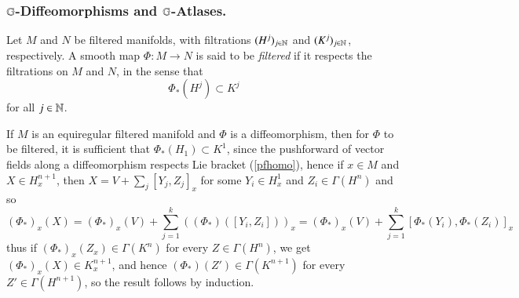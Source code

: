 \documentclass[leqno]{amsart}
\begin{document}
	
	\subsubsection{$\mathbb{G}$-Diffeomorphisms and $\mathbb{G}$-Atlases.}
	
	\begin{definition}
		Let $M$ and $N$ be filtered manifolds, with filtrations $(H^j)_{j\in\mathbb{N}}$ and $(K^j)_{j\in\mathbb{N}}$, respectively. A smooth map $\Phi:M\to N$ is said to be \textit{filtered} if it respects the filtrations on $M$ and $N$, in the sense that
		$$\Phi_*(H^j)\subset K^j$$
		for all $j\in\mathbb{N}$.
	\end{definition}
	
	\begin{remark}\label{firstlayer}
		If $M$ is an equiregular filtered manifold and $\Phi$ is a diffeomorphism, then for $\Phi$ to be filtered, it is sufficient that $\Phi_*(H_1)\subset K^1$, since the pushforward of vector fields along a diffeomorphism respects Lie bracket (\ref{pfhomo}), hence if $x\in M$ and $X\in H^{n+1}_x$, then $\displaystyle X=V+\sum_j[Y_j, Z_j]_x$ for some $Y_i\in H^1_x$ and $Z_i\in\Gamma(H^n)$ and so
		$$(\Phi_*)_x(X)=(\Phi_*)_x(V)+\sum_{j=1}^k((\Phi_*)([Y_i, Z_i]))_x=(\Phi_*)_x(V)+\sum_{j=1}^k[\Phi_*(Y_i), \Phi_*(Z_i)]_x$$
		thus if $(\Phi_*)_x(Z_x)\in\Gamma(K^n)$ for every $Z\in\Gamma(H^n)$, we get $(\Phi_*)_x(X)\in K^{n+1}_x$, and hence $(\Phi_*)(Z')\in\Gamma(K^{n+1})$ for every $Z'\in\Gamma(H^{n+1})$, so the result follows by induction.
	\end{remark}
	
\end{document}
